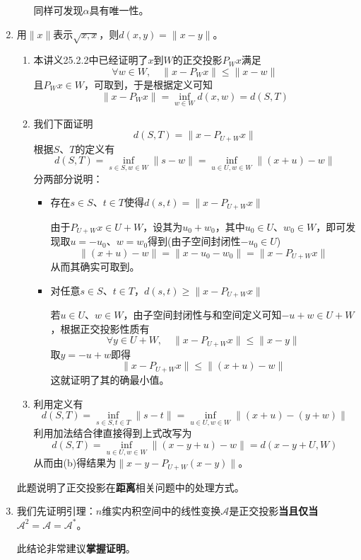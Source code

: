 \documentclass[a4paper,UTF8,fontset=windows,AutoFakeBold]{ctexart}
\newcommand*{\ma}{\mathcal{A}}
\newcommand*{\note}{\noindent *}
\begin{document}
\begin{enumerate}
\begin{enumerate}
        \note 同样可发现$\alpha$具有唯一性。
    \end{enumerate}

    \item
    用$\|x\|$表示$\sqrt{x,x}$，则$d(x,y)=\|x-y\|$。
    \begin{enumerate}
        \item 本讲义25.2.2中已经证明了$x$到$W$的正交投影$P_Wx$满足
        $$\forall w\in W,\quad\|x-P_Wx\|\le\|x-w\|$$
        且$P_Wx\in W$，可取到，于是根据定义可知
        $$\|x-P_Wx\|=\inf_{w\in W}d(x,w)=d(S,T)$$

        \item 
        我们下面证明
        $$d(S,T)=\|x-P_{U+W}x\|$$
        根据$S$、$T$的定义有
        $$d(S,T)=\inf_{s\in S,w\in W}\|s-w\|=\inf_{u\in U,w\in W}\|(x+u)-w\|$$
        分两部分说明：
        \begin{itemize}
            \item 存在$s\in S$、$t\in T$使得$d(s,t)=\|x-P_{U+W}x\|$
            
            由于$P_{U+W}x\in U+W$，设其为$u_0+w_0$，其中$u_0\in U$、$w_0\in W$，即可发现取$u=-u_0$、$w=w_0$得到(由子空间封闭性$-u_0\in U$)
            $$\|(x+u)-w\|=\|x-u_0-w_0\|=\|x-P_{U+W}x\|$$
            从而其确实可取到。
            
            \item 对任意$s\in S$、$t\in T$，$d(s,t)\ge\|x-P_{U+W}x\|$
            
            若$u\in U$、$w\in W$，由子空间封闭性与和空间定义可知$-u+w\in U+W$，根据正交投影性质有
            $$\forall y\in U+W,\quad\|x-P_{U+W}x\|\le\|x-y\|$$
            取$y=-u+w$即得
            $$\|x-P_{U+W}x\|\le\|(x+u)-w\|$$
            这就证明了其的确最小值。
        \end{itemize}

        \item 利用定义有
        $$d(S,T)=\inf_{s\in S,t\in T}\|s-t\|=\inf_{u\in U,w\in W}\|(x+u)-(y+w)\|$$
        利用加法结合律直接得到上式改写为
        $$d(S,T)=\inf_{u\in U,w\in W}\|(x-y+u)-w\|=d(x-y+U,W)$$
        从而由(b)得结果为$\|x-y-P_{U+W}(x-y)\|$。
    \end{enumerate}

    \note 此题说明了正交投影在\textbf{距离}相关问题中的处理方式。

    \item
    我们先证明引理：$n$维实内积空间中的线性变换$\ma$是正交投影\textbf{当且仅当}$\ma^2=\ma=\ma^*$。

    \note 此结论非常建议\textbf{掌握证明}。


\end{enumerate}
\end{document}
